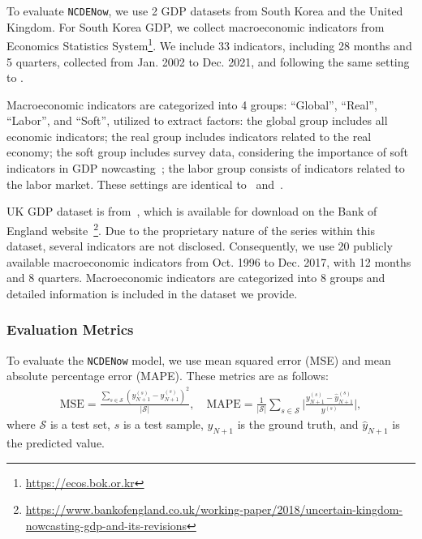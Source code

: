 \documentclass[sigconf]{acmart}
\begin{document}
To evaluate \texttt{NCDENow}, we use 2 GDP datasets from South Korea and the United Kingdom.
For South Korea GDP, we collect macroeconomic indicators from Economics Statistics System\footnote{\url{https://ecos.bok.or.kr}}. We include 33 indicators, including 28 months and 5 quarters, collected from Jan. 2002 to Dec. 2021, and following the same setting to \citet{lee2022d}. 

Macroeconomic indicators are categorized into 4 groups: ``Global'', ``Real'', ``Labor'', and ``Soft'', utilized to extract factors: the global group includes all economic indicators; the real group includes indicators related to the real economy; the soft group includes survey data, considering the importance of soft indicators in GDP nowcasting~\cite{kurz2019note}; the labor group consists of indicators related to the labor market. These settings are identical to~\citet{lee2022d} and~\citet{ylee2022a}.

UK GDP dataset is from~\citet{anesti2018uncertain}, which is available for download on the Bank of England website~\footnote{\url{https://www.bankofengland.co.uk/working-paper/2018/uncertain-kingdom-nowcasting-gdp-and-its-revisions}}. Due to the proprietary nature of the series within this dataset, several indicators are not disclosed. 
Consequently, we use 20 publicly available macroeconomic indicators from Oct. 1996 to Dec. 2017, with 12 months and 8 quarters. 
Macroeconomic indicators are categorized into 8 groups and detailed information is included in the dataset we provide.

\subsubsection{Evaluation Metrics}
To evaluate the \texttt{NCDENow} model, we use mean squared error (MSE) and mean absolute percentage error (MAPE). These metrics are as follows:
\begin{align}
    \text{MSE} = \frac{\sum_{s\in\mathcal{S}} (y_{N+1}^{(s)} - \hat{y}_{N+1}^{(s)})^{2}}{|\mathcal{S}|}, 
    \quad
    \text{MAPE} = \frac{1}{|\mathcal{S}|} \sum_{s\in\mathcal{S}} \lvert\frac{y_{N+1}^{(s)} - \hat{y}_{N+1}^{(s)}}{y^{(s)}}\rvert, \nonumber
\end{align}
where $\mathcal{S}$ is a test set, $s$ is a test sample, $y_{N+1}$ is the ground truth, and $\hat{y}_{N+1}$ is the predicted value.
\end{document}
